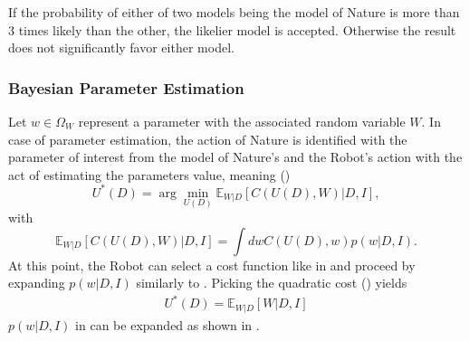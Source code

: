 \begin{definition}
	If the probability of either of two models being the model of Nature is more than 3 times likely than the other, the likelier model is accepted. Otherwise the result does not significantly favor either model.
\end{definition}

\subsubsection{Bayesian Parameter Estimation}
Let $w\in \Omega_W$ represent a parameter with the associated random variable $W$. In case of parameter estimation, the action of Nature is identified with the parameter of interest from the model of Nature's and the Robot's action with the act of estimating the parameters value, meaning ()
\begin{equation}
	U^*(D)=\arg\min_{U(D)}\mathbb{E}_{W|D}[C(U(D), W)|D,I],
\end{equation}
with
\begin{equation}
	\mathbb{E}_{W|D}[C(U(D), W)|D,I] = \int dw C(U(D),w)p(w|D,I).
\end{equation}
At this point, the Robot can select a cost function like in  and proceed by expanding $p(w|D,I)$ similarly to . Picking the quadratic cost () yields 
\begin{equation}
	\begin{split}
		U^*(D) = \mathbb{E}_{W|D}[W|D,I]
	\end{split}
	\label{eq:hest2}
\end{equation}
$p(w|D,I)$ in  can be expanded as shown in .

